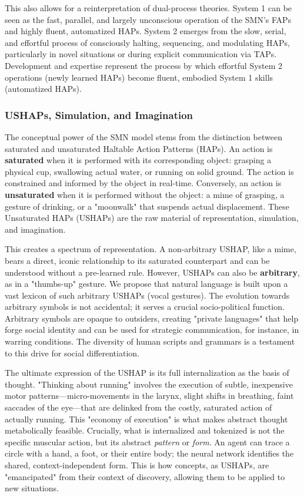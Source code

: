 This also allows for a reinterpretation of dual-process theories. System 1 can be seen as the fast, parallel, and largely unconscious operation of the SMN's FAPs and highly fluent, automatized HAPs. System 2 emerges from the slow, serial, and effortful process of consciously halting, sequencing, and modulating HAPs, particularly in novel situations or during explicit communication via TAPs. Development and expertise represent the process by which effortful System 2 operations (newly learned HAPs) become fluent, embodied System 1 skills (automatized HAPs).

\subsubsection{USHAPs, Simulation, and Imagination}
\label{ssubsec:ushaps}
The conceptual power of the SMN model stems from the distinction between saturated and unsaturated Haltable Action Patterns (HAPs). An action is \textbf{saturated} when it is performed with its corresponding object: grasping a physical cup, swallowing actual water, or running on solid ground. The action is constrained and informed by the object in real-time. Conversely, an action is \textbf{unsaturated} when it is performed without the object: a mime of grasping, a gesture of drinking, or a "moonwalk" that suspends actual displacement. These Unsaturated HAPs (USHAPs) are the raw material of representation, simulation, and imagination.

This creates a spectrum of representation. A non-arbitrary USHAP, like a mime, bears a direct, iconic relationship to its saturated counterpart and can be understood without a pre-learned rule. However, USHAPs can also be \textbf{arbitrary}, as in a "thumbs-up" gesture. We propose that natural language is built upon a vast lexicon of such arbitrary USHAPs (vocal gestures). The evolution towards arbitrary symbols is not accidental; it serves a crucial socio-political function. Arbitrary symbols are opaque to outsiders, creating "private languages" that help forge social identity and can be used for strategic communication, for instance, in warring conditions. The diversity of human scripts and grammars is a testament to this drive for social differentiation.

The ultimate expression of the USHAP is its full internalization as the basis of thought. "Thinking about running" involves the execution of subtle, inexpensive motor patterns—micro-movements in the larynx, slight shifts in breathing, faint saccades of the eye—that are delinked from the costly, saturated action of actually running. This "economy of execution" is what makes abstract thought metabolically feasible. Crucially, what is internalized and tokenized is not the specific muscular action, but its abstract \textit{pattern} or \textit{form}. An agent can trace a circle with a hand, a foot, or their entire body; the neural network identifies the shared, context-independent form. This is how concepts, as USHAPs, are "emancipated" from their context of discovery, allowing them to be applied to new situations.

